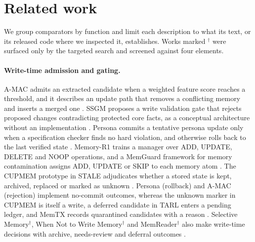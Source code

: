 \section{Related work}
\label{sec:related}
We group comparators by function and limit each description to what its text, or its released code where we inspected it, establishes. Works marked $^{\dagger}$ were surfaced only by the targeted search and screened against four elements.

\paragraph{Write-time admission and gating.} A-MAC admits an extracted candidate when a weighted feature score reaches a threshold, and it describes an update path that removes a conflicting memory and inserts a merged one \citep{arxiv_2603_04549}. SSGM proposes a write validation gate that rejects proposed changes contradicting protected core facts, as a conceptual architecture without an implementation \citep{arxiv_2603_11768}. Persona commits a tentative persona update only when a specification checker finds no hard violation, and otherwise rolls back to the last verified state \citep{persona_symmetry_2026}. Memory-R1 trains a manager over ADD, UPDATE, DELETE and NOOP operations, and a MemGuard framework for memory contamination assigns ADD, UPDATE or SKIP to each memory atom \citep{arxiv_2508_19828,arxiv_2605_28009}. The CUPMEM prototype in STALE adjudicates whether a stored state is kept, archived, replaced or marked as unknown \citep{arxiv_2605_06527}. Persona (rollback) and A-MAC (rejection) implement no-commit outcomes, whereas the unknown marker in CUPMEM is itself a write, a deferred candidate in TARL enters a pending ledger, and MemTX records quarantined candidates with a reason \citep{persona_symmetry_2026,arxiv_2603_04549,arxiv_2605_06527,arxiv_2608_03699,arxiv_2607_23929}. Selective Memory$^{\dagger}$, When Not to Write Memory$^{\dagger}$ and MemReader$^{\dagger}$ also make write-time decisions with archive, needs-review and deferral outcomes \citep{arxiv_2603_15994,arxiv_2607_02579,arxiv_2604_07877}.

